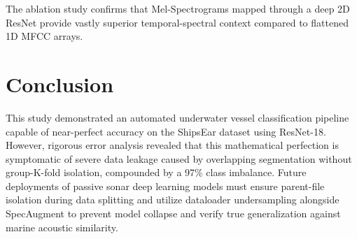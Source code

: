 \documentclass[conference]{IEEEtran}
\begin{document}
The ablation study confirms that Mel-Spectrograms mapped through a deep 2D ResNet provide vastly superior temporal-spectral context compared to flattened 1D MFCC arrays.

\section{Conclusion}
This study demonstrated an automated underwater vessel classification pipeline capable of near-perfect accuracy on the ShipsEar dataset using ResNet-18. However, rigorous error analysis revealed that this mathematical perfection is symptomatic of severe data leakage caused by overlapping segmentation without group-K-fold isolation, compounded by a 97\% class imbalance. Future deployments of passive sonar deep learning models must ensure parent-file isolation during data splitting and utilize dataloader undersampling alongside SpecAugment to prevent model collapse and verify true generalization against marine acoustic similarity.



\end{document}
